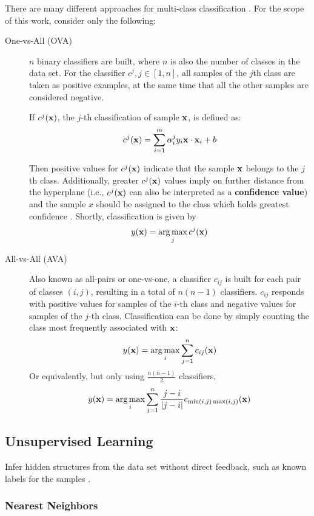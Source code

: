There are many different approaches for multi-class classification \cite{rif2008}. For the scope of this work, consider only the following:

\begin{description}
	\item[One-vs-All (OVA)] $n$ binary classifiers are built, where $n$ is also the number of classes in the data set. For the classifier $c^j, j \in [1, n]$, all samples of the $j$th class are taken as positive examples, at the same time that all the other samples are considered negative.

	If $c^j(\mathbf{x})$, the $j$-th classification of sample $\mathbf{x}$, is defined as:
	$$c^j(\mathbf{x}) = \sum_{i=1}^{m} \alpha_i^j y_i \mathbf{x} \cdot \mathbf{x}_i + b$$

	Then positive values for $c^j(\mathbf{x})$ indicate that the sample $\mathbf{x}$ belongs to the $j$th class. Additionally, greater $c^j(\mathbf{x})$ values imply on further distance from the hyperplane (i.e., $c^j(\mathbf{x})$ can also be interpreted as a \textbf{confidence value}) and the sample $x$ should be assigned to the class which holds greatest confidence \cite{ovacj}. Shortly, classification is given by
	$$ y(\mathbf{x}) = \operatorname*{arg\,max}_j{c^j(\mathbf{x})} $$	
	\item[All-vs-All (AVA)] Also known as all-pairs or one-vs-one, a classifier $c_{ij}$ is built for each pair of classes $(i, j)$, resulting in a total of $n(n-1)$ classifiers. $c_{ij}$ responds with positive values for samples of the $i$-th class and negative values for samples of the $j$-th class. Classification can be done by simply counting the class most frequently associated with $\mathbf{x}$:
	$$ y(\mathbf{x}) = \operatorname*{arg\,max}_i{\sum_{j=1}^{n} c_{ij}(\mathbf{x})} $$
	Or equivalently, but only using $\frac{n(n-1)}{2}$ classifiers,
	$$ y(\mathbf{x}) = \operatorname*{arg\,max}_i{\sum_{j=1}^{n} \frac{j-i}{|j-i|} c_{\min(i, j) \max(i, j)}(\mathbf{x})} $$
\end{description}

\subsection{Unsupervised Learning}
Infer hidden structures from the data set without direct feedback, such as known labels for the samples \cite{awa2015}.

\subsubsection{Nearest Neighbors}

